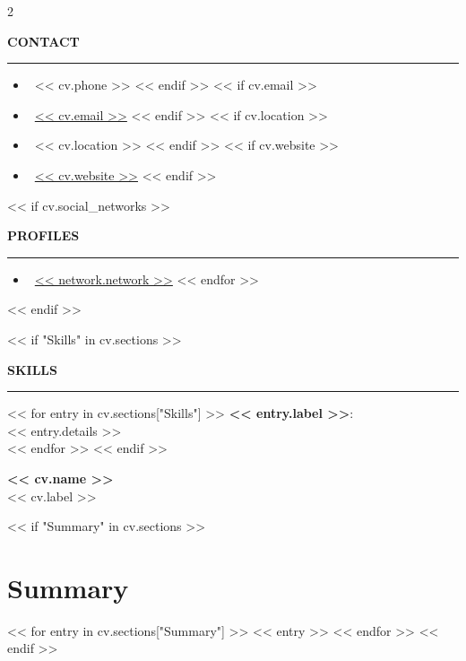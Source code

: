 \documentclass[10pt, letterpaper]{article}
\newcommand{\leftsection}[1]{
    \vspace{1.5ex}
    {\large\bfseries\color{whiteColor}\uppercase{#1}} \\
    \vspace{-0.5em}\rule{\linewidth}{1pt}
    \vspace{1ex}
}
\newcommand{\cvheader}[2]{
    \begin{center}
        {\Huge \bfseries #1} \\ \vspace{0.5em}
        {\large #2}
    \end{center}
}
\begin{document}
\begin{paracol}{2}

\begin{leftcolumn}
\colorbox{primaryColor}{
    \begin{minipage}{\linewidth}
    \color{whiteColor}
    \leftsection{Contact}
    \begin{itemize}[label={}, leftmargin=0pt]
        << if cv.phone >>
        \item \faPhone \ << cv.phone >>
        << endif >>
        << if cv.email >>
        \item \faEnvelope \ \href{mailto:<< cv.email >>}{\textcolor{whiteColor}{<< cv.email >>}}
        << endif >>
        << if cv.location >>
        \item \faMapMarker \ << cv.location >>
        << endif >>
        << if cv.website >>
        \item \faGlobe \ \href{<< cv.website >>}{\textcolor{whiteColor}{<< cv.website >>}}
        << endif >>
    \end{itemize}

    << if cv.social_networks >>
    \leftsection{Profiles}
    \begin{itemize}[label={}, leftmargin=0pt]
        << for network in cv.social_networks >>
        \item \faLink \ \href{<< network.url >>}{\textcolor{whiteColor}{<< network.network >>}}
        << endfor >>
    \end{itemize}
    << endif >>

    << if "Skills" in cv.sections >>
    \leftsection{Skills}
    << for entry in cv.sections["Skills"] >>
    \textbf{<< entry.label >>}: \\
    << entry.details >> \\
    << endfor >>
    << endif >>

    \vspace{2cm} %
    \end{minipage}
}
\end{leftcolumn}

\begin{rightcolumn}
    \cvheader{<< cv.name >>}{<< cv.label >>}

    << if "Summary" in cv.sections >>
    \section*{Summary}
    << for entry in cv.sections["Summary"] >>
    << entry >>
    << endfor >>
    << endif >>


\end{rightcolumn}
\end{paracol}
\end{document}
